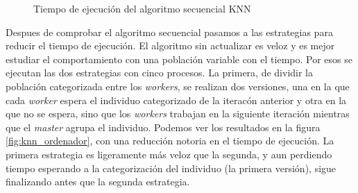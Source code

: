			\newpage
		

			\begin{figure}[!h]
				\centering
				\caption{Tiempo de ejecución del algoritmo secuencial KNN}
				\label{fig:knn_secuencial}
			\end{figure}

			
		
			Despues de comprobar el algoritmo secuencial pasamos a las estrategias para reducir el tiempo de ejecución. El algoritmo sin actualizar es veloz y es mejor estudiar el comportamiento con una población variable con el tiempo. Por esos se ejecutan las dos estrategias con cinco procesos. La primera, de dividir la población categorizada entre los \textit{workers}, se realizan dos versiones, una en la que cada \textit{worker} espera el individuo categorizado de la iteracón anterior y otra en la que no se espera, sino que los \textit{workers} trabajan en la siguiente iteración mientras que el \textit{master} agrupa el individuo. Podemos ver los resultados en la figura \ref{fig:knn_ordenador}, con una reducción notoria en el tiempo de ejecución. La primera estrategia es ligeramente más veloz que la segunda, y aun perdiendo tiempo esperando a la categorización del individuo (la primera versión), sigue finalizando antes que la segunda estrategia. 
			

